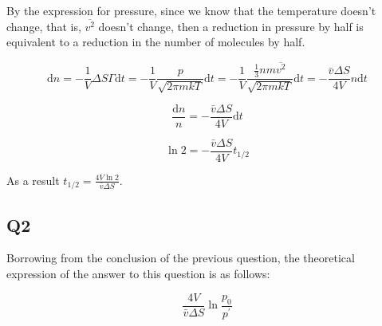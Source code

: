 \documentclass[a4paper,11pt]{amsart}
\theoremstyle{definition}
\begin{document}
	By the expression for pressure, since we know that the temperature doesn't change, that is, $\overline{v^2}$ doesn't change, then a reduction in pressure by half is equivalent to a reduction in the number of molecules by half.

	$$
	\mathrm{d}n=-\frac{1}{V}\Delta S\varGamma \mathrm{d}t=-\frac{1}{V}\frac{p}{\sqrt{2\pi mkT}}\mathrm{d}t=-\frac{1}{V}\frac{\frac{1}{3}nm\overline{v^2}}{\sqrt{2\pi mkT}}\mathrm{d}t=-\frac{\bar{v}\Delta S}{4V}n\mathrm{d}t
	$$

	$$
	\frac{\mathrm{d}n}{n}=-\frac{\bar{v}\Delta S}{4V}\mathrm{d}t
	$$

	$$
	\ln 2=-\frac{\bar{v}\Delta S}{4V}t_{1/2}
	$$

	As a result $\displaystyle t_{1/2}=\frac{4V\ln 2}{\bar{v}\Delta S}$.

	\subsection*{Q2}

	Borrowing from the conclusion of the previous question, the theoretical expression of the answer to this question is as follows:

	$$
	\frac{4V}{\bar{v}\Delta S}\ln \frac{p_0}{p^{\prime}}
	$$
\end{document}
